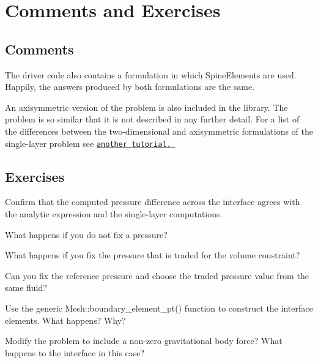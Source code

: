  

\hypertarget{index_comments}{}\section{Comments and Exercises}\label{index_comments}
\hypertarget{index_com}{}\subsection{Comments}\label{index_com}

\begin{DoxyItemize}
\item The driver code also contains a formulation in which {\ttfamily Spine\+Elements} are used. Happily, the answers produced by both formulations are the same.
\item An axisymmetric version of the problem is also included in the library. The problem is so similar that it is not described in any further detail. For a list of the differences between the two-\/dimensional and axisymmetric formulations of the single-\/layer problem see \href{../../../axisym_navier_stokes/axi_static_cap/html/index.html}{\tt another tutorial. }
\end{DoxyItemize}\hypertarget{index_exercises}{}\subsection{Exercises}\label{index_exercises}

\begin{DoxyEnumerate}
\item Confirm that the computed pressure difference across the interface agrees with the analytic expression and the single-\/layer computations.
\item What happens if you do not fix a pressure?
\item What happens if you fix the pressure that is traded for the volume constraint?
\item Can you fix the reference pressure and choose the traded pressure value from the same fluid?
\item Use the generic {\ttfamily Mesh\+::boundary\+\_\+element\+\_\+pt()} function to construct the interface elements. What happens? Why?
\item Modify the problem to include a non-\/zero gravitational body force? What happens to the interface in this case?
\end{DoxyEnumerate}

 

